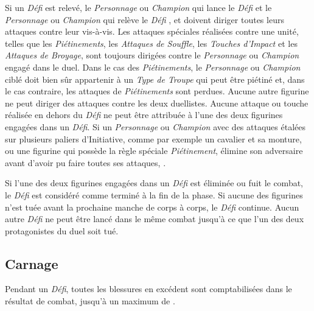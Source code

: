 Si un \emph{Défi} est relevé, le \emph{Personnage} ou \emph{Champion} qui lance le \emph{Défi} et le \emph{Personnage} ou \emph{Champion} qui relève le \emph{Défi} , et doivent diriger toutes leurs attaques contre leur vis-à-vis. Les attaques spéciales réalisées contre une unité, telles que les \emph{Piétinements}, les \emph{Attaques de Souffle}, les \emph{Touches d’Impact} et les \emph{Attaques de Broyage}, sont toujours dirigées contre le \emph{Personnage} ou \emph{Champion} engagé dans le duel. Dans le cas des \emph{Piétinements}, le \emph{Personnage} ou \emph{Champion} ciblé doit bien sûr appartenir à un \emph{Type de Troupe} qui peut  être piétiné et, dans le cas contraire, les attaques de \emph{Piétinements} sont perdues. Aucune autre figurine ne peut diriger des attaques contre les deux duellistes. Aucune attaque ou touche réalisée en dehors du \emph{Défi} ne peut être attribuée à l'une des deux figurines engagées dans un \emph{Défi}. Si un \emph{Personnage} ou \emph{Champion} avec des attaques étalées sur plusieurs paliers d'Initiative, comme par exemple un cavalier et sa monture, ou une figurine qui possède la règle spéciale \emph{Piétinement}, élimine son adversaire avant d'avoir pu faire toutes ses attaques, .

Si l'une des deux figurines engagées dans un \emph{Défi} est éliminée ou fuit le combat, le \emph{Défi} est considéré comme terminé à la fin de la phase. Si aucune des figurines n'est tuée avant la prochaine manche de corps à corps, le \emph{Défi} continue. Aucun autre \emph{Défi} ne peut être lancé dans le même combat jusqu'à ce que l'un des deux protagonistes du duel soit tué.

\subsection{Carnage}

Pendant un \emph{Défi}, toutes les blessures en excédent sont comptabilisées dans le résultat de combat, jusqu'à un maximum de .

